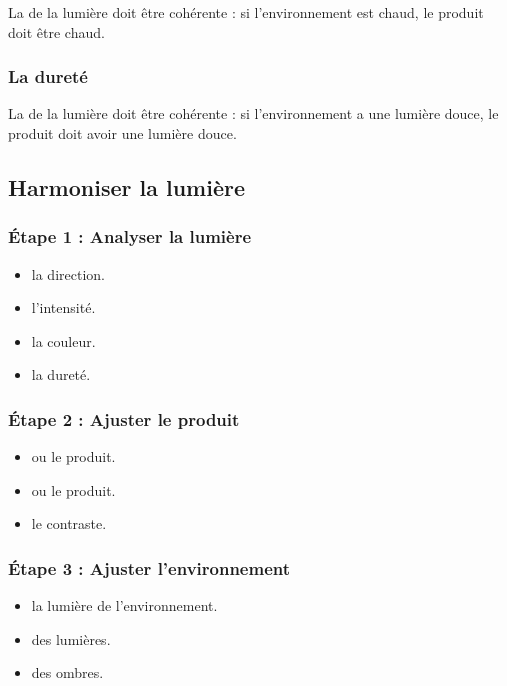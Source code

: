 La  de la lumière doit être cohérente : si l'environnement est chaud, le produit doit être chaud.

\subsubsection{La dureté}

La  de la lumière doit être cohérente : si l'environnement a une lumière douce, le produit doit avoir une lumière douce.

\subsection{Harmoniser la lumière}

\subsubsection{Étape 1 : Analyser la lumière}

\begin{itemize}
    \item {} la direction.
    \item {} l'intensité.
    \item {} la couleur.
    \item {} la dureté.
\end{itemize}

\subsubsection{Étape 2 : Ajuster le produit}

\begin{itemize}
    \item {} ou  le produit.
    \item {} ou  le produit.
    \item {} le contraste.
\end{itemize}

\subsubsection{Étape 3 : Ajuster l'environnement}

\begin{itemize}
    \item {} la lumière de l'environnement.
    \item {} des lumières.
    \item {} des ombres.
\end{itemize}

